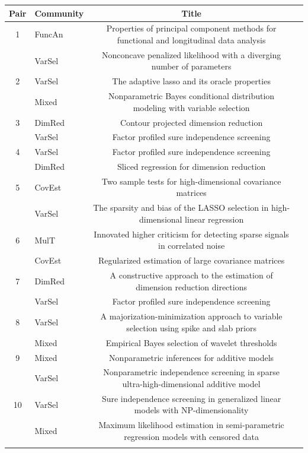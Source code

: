 \documentclass[AMS,STIX1COL]{WileyNJD-v2}
\begin{document}
{%
\begin{table}[htbp]
\centering
\begin{tabular}{clcl}\hline
Pair & Community & Title  & \\
\hline
1    & FuncAn    & Properties of principal component methods for functional and longitudinal data analysis       & \\
     & VarSel    & Nonconcave penalized likelihood with a diverging number of parameters                        & \\
2    & VarSel      & The adaptive lasso and its oracle properties                              & \\
     & Mixed    & Nonparametric Bayes conditional distribution modeling with variable selection     & \\
3    & DimRed    & Contour projected dimension reduction                                                      & \\
     & VarSel    & Factor profiled sure independence screening & \\
4    & VarSel    & Factor profiled sure independence screening & \\
     & DimRed    & Sliced regression for dimension reduction  & \\
5    & CovEst    & Two sample tests for high-dimensional covariance matrices & \\
     & VarSel      & The sparsity and bias of the {LASSO} selection in high-dimensional linear regression         & \\
6    & MulT    & Innovated higher criticism for detecting sparse signals in correlated noise      & \\
     & CovEst     & Regularized estimation of large covariance matrices   &  \\
7    & DimRed    & A constructive approach to the estimation of dimension reduction directions       & \\
     & VarSel     & Factor profiled sure independence screening   & \\
8    & VarSel    & A majorization-minimization approach to variable selection using spike and slab priors & \\
     & Mixed      & Empirical {B}ayes selection of wavelet thresholds               & \\
9    & Mixed    & Nonparametric inferences for additive models          & \\
     & VarSel    & Nonparametric independence screening in sparse ultra-high-dimensional additive model  & \\
10   & VarSel    & Sure independence screening in generalized linear models with {NP}-dimensionality & \\
     & Mixed     & Maximum likelihood estimation in semi-parametric regression models with censored data & \\
\hline \\
\end{tabular}


\end{table}}
\end{document}
